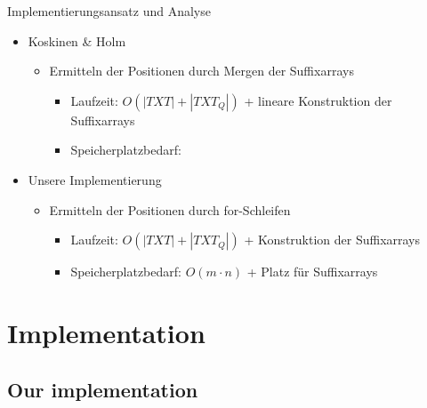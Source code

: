 \documentclass[aspectratio=1610]{beamer}
\begin{document}
\begin{frame}{Implementierungsansatz und Analyse}
  \begin{itemize}
    \item Koskinen \& Holm
      \begin{itemize}
        \item Ermitteln der Positionen durch Mergen der Suffixarrays
          \begin{itemize}
            \item Laufzeit: $O(|TXT|+|TXT_Q|)$ + lineare Konstruktion der Suffixarrays
            \item Speicherplatzbedarf:
          \end{itemize}
      \end{itemize}
    \item Unsere Implementierung
      \begin{itemize}
        \item Ermitteln der Positionen durch for-Schleifen
          \begin{itemize}
            \item Laufzeit: $O(|TXT|+|TXT_Q|)$ + Konstruktion der Suffixarrays
            \item Speicherplatzbedarf: $O(m \cdot n)$ + Platz für Suffixarrays
          \end{itemize}
      \end{itemize}
  \end{itemize}
\end{frame}

\section{Implementation}

\subsection{Our implementation}
\end{document}
